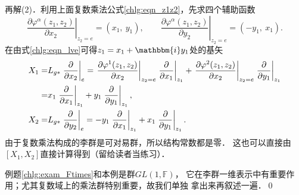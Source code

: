 再解(2)．利用上面复数乘法公式\eqref{chlg:eqn_z1z2}，先求四个辅助函数
\begin{equation}
    \left. \frac{\partial \varphi^\alpha (z_1,z_2)}{\partial x_2} \right|_{z_2=e} = (x_1,\ y_1) ,\qquad
    \left. \frac{\partial \varphi^\alpha (z_1,z_2)}{\partial y_2} \right|_{z_2=e} = (-y_1,\ x_1) .
\end{equation}
在由式\eqref{chlg:eqn_lve}可得$z_1=x_1+\mathbbm{i} y_1$处的基矢
\begin{align}
    X_1=&L_{g*} \left.\frac{\partial }{\partial x_2}\right|_{e} = 
    \left. \frac{\partial \varphi^1 (z_1,z_2)}{\partial x_2} 
    \right|_{z_2=e}   \left. \frac{\partial}{\partial x_1}\right|_{z_1} +
    \left. \frac{\partial \varphi^2 (z_1,z_2)}{\partial x_2} 
    \right|_{z_2=e}   \left. \frac{\partial}{\partial y_1}\right|_{z_1} \notag \\
    =& x_1\left. \frac{\partial}{\partial x_1}\right|_{z_1}+ y_1\left. \frac{\partial}{\partial y_1}\right|_{z_1}, \\
    X_2=&L_{g*} \left.\frac{\partial }{\partial y_2} \right|_{e}= 
       -y_1\left. \frac{\partial}{\partial x_1}\right|_{z_1}+ x_1\left. \frac{\partial}{\partial y_1}\right|_{z_1} .
\end{align}
由于复数乘法构成的李群是可对易群，所以结构常数都是零．
这也可以直接由$[X_1,X_2]$直接计算得到（留给读者当练习）．

例题\ref{chlg:exam_Ftimes}和本例是群$GL(1,\mathbb{F})$，
它在李群一维表示中有重要作用；尤其复数域上的乘法群特别重要，故我们单独
拿出来再叙述一遍．\qed

